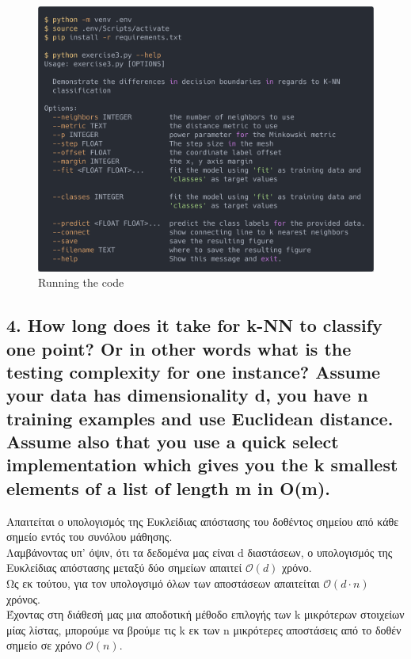 \documentclass[12pt]{article}
\newenvironment{matlab}
	{\begin{figure}[H]\centering\captionsetup{justification=centering}}
	{\end{figure}}
\begin{document}
\begin{matlab}
    \includegraphics[scale=0.140]{images/exercise3/instructions.png}
    \caption{Running the code}
\end{matlab}

\pagebreak

\subsection*{4. How long does it take for k-NN to classify one point? Or in other words
	what is the testing complexity for one instance? Assume your data has dimensionality d, you
	have n training examples and use Euclidean distance. Assume also that you use a quick select
	implementation which gives you the k smallest elements of a list of length m in O(m).}

Απαιτείται ο υπολογισμός της Ευκλείδιας απόστασης του δοθέντος σημείου από κάθε
σημείο εντός του συνόλου μάθησης. \\

Λαμβάνοντας υπ' όψιν, ότι τα δεδομένα μας είναι d διαστάσεων, ο υπολογισμός της Ευκλείδιας
απόστασης μεταξύ δύο σημείων απαιτεί \( \mathcal{O}(d) \) χρόνο. \\

Ως εκ τούτου, για τον υπολογσιμό όλων των αποστάσεων απαιτείται
\( \mathcal{O}(d \cdot n) \) χρόνος. \\

Έχοντας στη διάθεσή μας μια αποδοτική μέθοδο επιλογής των k μικρότερων στοιχείων
μίας λίστας, μπορούμε να βρούμε τις k εκ των n μικρότερες αποστάσεις από το δοθέν σημείο
σε χρόνο \( \mathcal{O}(n) \). \\
\end{document}
